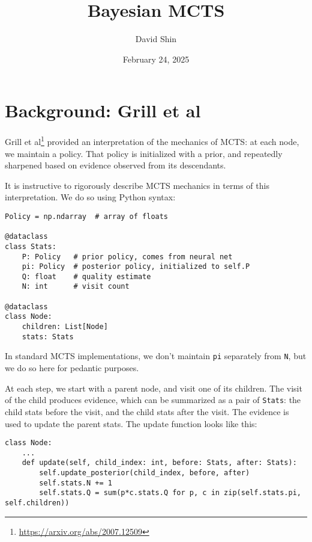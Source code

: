 \documentclass[tikz]{article}
\title{Bayesian MCTS}
\author{David Shin}
\date{February 24, 2025}
\begin{document}
\maketitle

\section{Background: Grill et al}

Grill et al\footnote{\url{https://arxiv.org/abs/2007.12509}} provided an interpretation of the mechanics of MCTS: at each node, 
we maintain a policy. That policy is initialized with a prior, and repeatedly sharpened based on evidence observed from its descendants. \newline

It is instructive to rigorously describe MCTS mechanics in terms of this interpretation. We do so using Python syntax:

\begin{tcolorbox}
\begin{verbatim}
Policy = np.ndarray  # array of floats

@dataclass
class Stats:
    P: Policy   # prior policy, comes from neural net
    pi: Policy  # posterior policy, initialized to self.P
    Q: float    # quality estimate
    N: int      # visit count

@dataclass
class Node:
    children: List[Node]
    stats: Stats
\end{verbatim}
\end{tcolorbox}

In standard MCTS implementations, we don't maintain \texttt{pi} separately from \texttt{N}, but we do so here for pedantic purposes. \newline

At each step, we start with a parent node, and visit one of its children. The visit of the child produces evidence, 
which can be summarized as a pair of \texttt{Stats}: the child stats before the visit, 
and the child stats after the visit. The evidence is used to update the parent stats. The update function looks like this:

\begin{tcolorbox}
\begin{verbatim}
class Node:
    ...
    def update(self, child_index: int, before: Stats, after: Stats):
        self.update_posterior(child_index, before, after)
        self.stats.N += 1
        self.stats.Q = sum(p*c.stats.Q for p, c in zip(self.stats.pi, self.children))
\end{verbatim}
\end{tcolorbox}
\end{document}
